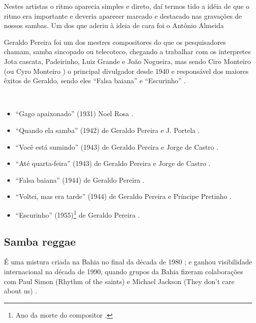 Nestes artistas o ritmo aparecia simples e direto, daí termos tido a idéia de 
que o ritmo era importante e deveria aparecer marcado e destacado nas gravações 
de nossos sambas. Um dos que aderiu à ideia de cara foi o Antônio Almeida


Geraldo Pereira foi um dos mestres compositores do que os pesquisadores chamam, samba sincopado ou telecoteco,
chegando a trabalhar com os interpretes Jota cascata, Padeirinho, Luiz Grande e João Nogueira,
mas sendo Ciro Monteiro (ou Cyro Monteiro \cite{avelino2018tecituras}) o principal divulgador desde 1940 e
responsável dos maiores êxitos de Geraldo, sendo eles ``Falsa baiana'' e ``Escurinho'' \cite[pp. 68]{diniz2006almanaque}.

\begin{example} ~

\begin{itemize}
\item ``Gago apaixonado'' (1931) Noel Rosa \cite[pp, 990]{marcondes1977enciclopediav2} \cite[pp. 129]{perna2002samba}.
\item ``Quando ela samba'' (1942) de Geraldo Pereira e J. Portela \cite[pp, 1083]{marcondes1977enciclopediav2} \cite[pp. 52]{diniz2006almanaque}.
\item ``Você está sumindo'' (1943) de Geraldo Pereira e Jorge de Castro \cite[pp, 1154]{marcondes1977enciclopediav2} \cite[pp. 52]{diniz2006almanaque}.
\item ``Até quarta-feira'' (1943) de Geraldo Pereira e Jorge de Castro \cite[pp, 909]{marcondes1977enciclopediav2} \cite[pp. 52]{diniz2006almanaque}.
\item ``Falsa baiana'' (1944) de Geraldo Pereira \cite[pp. 107]{de2003tem} \cite[pp. ]{beattie2003human} \cite[pp. 52]{diniz2006almanaque}.
\item ``Voltei, mas era tarde'' (1944) de Geraldo Pereira e Príncipe Pretinho \cite[pp, 1156]{marcondes1977enciclopediav2} \cite[pp. 52]{diniz2006almanaque}.
\item ``Escurinho'' (1955)\footnote{Ano da morte do compositor \cite[pp. 69]{diniz2006almanaque}.} de Geraldo Pereira \cite[pp. 69]{diniz2006almanaque}.

\end{itemize}
\end{example}


\subsection{Samba reggae}
É uma mistura criada na Bahia no final da década de 1980 \cite[pp. 178]{diniz2008almanaque} \cite[pp. 187]{casa1992anales} \cite[pp. 64]{crook2005brazilian};
e ganhou visibilidade internacional na década de 1990, 
quando grupos da Bahia fizeram  colaborações com Paul Simon (Rhythm of the saints) e  
Michael Jackson (They don't care about us) 
 \cite[pp. 207]{dunn2014brutality} \cite[pp. 64]{crook2005brazilian}.

